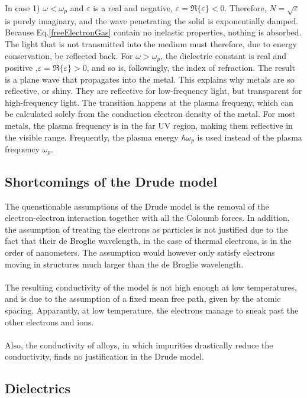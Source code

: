In case 1) $\omega < \omega_p$ 
and $\varepsilon$ is a real and negative, $\varepsilon = \Re\{\varepsilon\} < 0$.
Therefore, $N = \sqrt{\varepsilon}$ is purely imaginary, and the wave penetrating the solid
is exponentially damped. Because Eq.\eqref{freeElectronGas} contain no inelastic properties, nothing
is absorbed. The light that is not transmitted into the medium must therefore, due to energy conservation, be
reflected back. 
For $\omega > \omega_p$, the dielectric constant is real and positive ,$\varepsilon = \Re\{\varepsilon\} > 0$,
and so is, followingly, the index of refraction. The result is a plane wave that propagates 
into the metal. This explains why metals are so reflective, or shiny. They are reflective for 
low-frequency light, but transparent for high-frequency light. The transition happens
at the plasma frequeny, which can be calculated solely from the conduction electron density of 
the metal. For most metals, the plasma frequency is in the far UV region, making them reflective 
in the visible range. Frequently, the plasma energy $\hbar \omega_p$ is used instead of the plasma frequency
$\omega_p$.

\subsection{Shortcomings of the Drude model}
The quenstionable assumptions of the Drude model is the removal of the electron-electron interaction
together with all the Coloumb forces. In addition, the assumption of treating the electrons as 
particles is not justified due to the fact that their de Broglie wavelength, in the case of thermal
electrons, is in the order of nanometers. The assumption would however only satisfy electrons moving
in structures much larger than the de Broglie wavelength.
\\
\\
The resulting conductivity of the model is not high enough at low temperatures, and is due to the
assumption of a fixed mean free path, given by the atomic spacing. Apparantly, at low temperature,
the electrons manage to sneak past the other electrons and ions. 
\\
\\
Also, the conductivity of alloys, in which impurities drastically reduce the conductivity, finds no
justification in the Drude model. 


\subsection{\textbf{Dielectrics}}
